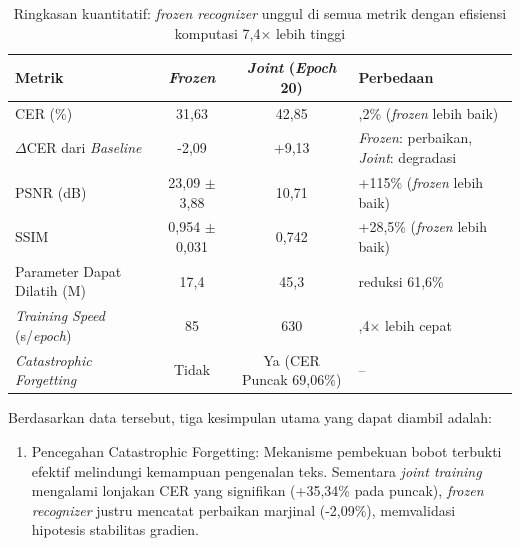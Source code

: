 \begin{enumerate}[leftmargin=1.5em, labelsep=0.5em, itemindent=0pt, noitemsep, topsep=0pt, label=\arabic*., leftmargin=0.8cm]
          \begin{table}[!htbp]
              \caption[Temuan kunci frozen berbanding joint]{Ringkasan kuantitatif: \textit{frozen recognizer} unggul di semua metrik dengan efisiensi komputasi 7,4$\times$ lebih tinggi}
              \label{tab:frozen-vs-joint-summary}
              \small
              \begin{tabularx}{\textwidth}{|>{\raggedright\arraybackslash}X|c|c|>{\raggedright\arraybackslash}X|}
                  \hline
                  \textbf{Metrik}                    & \textbf{\textit{Frozen}}            & \textbf{\textit{Joint} (\textit{Epoch} 20)}      & \textbf{Perbedaan}                           \\
                  \hline
                  CER (\%)                  & 31,63             & 42,85                 & -26,2\% (\textit{frozen} lebih baik)         \\[0.3em]
                  $\Delta$CER dari \textit{Baseline} & -2,09             & +9,13                 & \textit{Frozen}: perbaikan, \textit{Joint}: degradasi \\[0.3em]
                  PSNR (dB)                 & 23,09 $\pm$ 3,88  & 10,71                 & +115\% (\textit{frozen} lebih baik)          \\[0.3em]
                  SSIM                      & 0,954 $\pm$ 0,031 & 0,742                 & +28,5\% (\textit{frozen} lebih baik)         \\[0.3em]
                  Parameter Dapat Dilatih (M)      & 17,4              & 45,3                  & reduksi 61,6\%                    \\[0.3em]
                  \textit{Training Speed} (s/\textit{epoch})  & 85                & 630                   & 7,4$\times$ lebih cepat             \\[0.3em]
                  \textit{Catastrophic Forgetting}   & Tidak             & Ya (CER Puncak 69,06\%)        & --                                 \\
                  \hline
              \end{tabularx}
          \end{table}

          Berdasarkan data tersebut, tiga kesimpulan utama yang dapat diambil adalah:
          \begin{enumerate}[leftmargin=1.5em, labelsep=0.5em, itemindent=0pt, noitemsep, topsep=0pt, label=\alph*)]
              \item Pencegahan Catastrophic Forgetting: Mekanisme pembekuan bobot terbukti efektif melindungi kemampuan pengenalan teks. Sementara \textit{joint training} mengalami lonjakan CER yang signifikan (+35,34\% pada puncak), \textit{frozen recognizer} justru mencatat perbaikan marjinal (-2,09\%), memvalidasi hipotesis stabilitas gradien.


\end{enumerate}
\end{enumerate}
